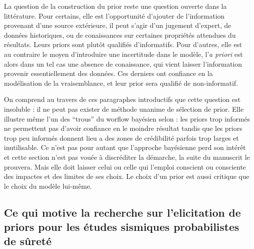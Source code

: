 
La question de la construction du prior reste une question ouverte dans la littérature. %
Pour certains, elle est l'opportunité d'ajouter de l'information provenant d'une source extérieure, il peut s'agir d'un jugement d'expert, de données historiques, ou de conaissances sur certaines propriétés attendues du résultats. Leurs priors sont plutôt qualifiés d'informatifs.
Pour d'autres, elle est au contraire le moyen d'introduire une incertitude dans le modèle, l'\emph{a priori} est alors dans un tel cas une absence de conaissance, qui vient laisser l'information provenir essentiellement des données. Ces derniers ont confiance en la modélisation de la vraisemblance, et leur prior sera qualifié de non-informatif.


On comprend au travers de ces paragraphes introductifs que cette question est insoluble : il ne peut pas exister de méthode unanime de sélection de prior. Elle illustre même l'un des ``trous'' du worflow bayésien selon \citet{gelman_holes_2020} : les priors trop informés ne permettent pas d'avoir confiance en le moindre résultat tandis que les priors trop peu informés %
donnent lieu a des zones de crédibilité parfois trop larges et inutilisable.
Ce n'est pas pour autant que l'approche bayésienne perd son intérêt et cette section n'est pas vouée à discréditer la démarche, la suite du manuscrit le prouvera. %
Mais elle doit laisser celui ou celle qui l'emploi conscient ou consciente des impactes et des limites de ses choix. Le choix d'un prior est aussi critique que le choix du modèle lui-même.














\subsection{Ce qui motive la recherche sur l'elicitation de priors pour les études sismiques probabilistes de sûreté}

